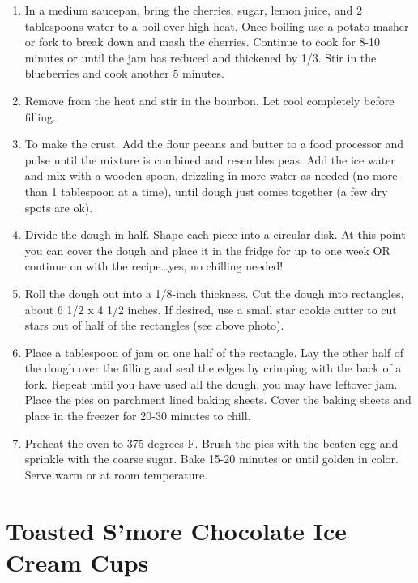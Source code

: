 \documentclass[
  letterpaper,
  DIV=11,
  numbers=noendperiod,
  titlepage=false]{scrreprt}
\providecommand{\tightlist}{%
  \setlength{\itemsep}{0pt}\setlength{\parskip}{0pt}}\usepackage{longtable,booktabs,array}
\begin{document}
\begin{enumerate}
\def\labelenumi{\arabic{enumi}.}
\tightlist
\item
  In a medium saucepan, bring the cherries, sugar, lemon juice, and 2
  tablespoons water to a boil over high heat. Once boiling use a potato
  masher or fork to break down and mash the cherries. Continue to cook
  for 8-10 minutes or until the jam has reduced and thickened by 1/3.
  Stir in the blueberries and cook another 5 minutes.
\item
  Remove from the heat and stir in the bourbon. Let cool completely
  before filling.
\item
  To make the crust. Add the flour pecans and butter to a food processor
  and pulse until the mixture is combined and resembles peas. Add the
  ice water and mix with a wooden spoon, drizzling in more water as
  needed (no more than 1 tablespoon at a time), until dough just comes
  together (a few dry spots are ok).
\item
  Divide the dough in half. Shape each piece into a circular disk. At
  this point you can cover the dough and place it in the fridge for up
  to one week OR continue on with the recipe\ldots yes, no chilling
  needed!
\item
  Roll the dough out into a 1/8-inch thickness. Cut the dough into
  rectangles, about 6 1/2 x 4 1/2 inches. If desired, use a small star
  cookie cutter to cut stars out of half of the rectangles (see above
  photo).
\item
  Place a tablespoon of jam on one half of the rectangle. Lay the other
  half of the dough over the filling and seal the edges by crimping with
  the back of a fork. Repeat until you have used all the dough, you may
  have leftover jam. Place the pies on parchment lined baking sheets.
  Cover the baking sheets and place in the freezer for 20-30 minutes to
  chill.
\item
  Preheat the oven to 375 degrees F. Brush the pies with the beaten egg
  and sprinkle with the coarse sugar. Bake 15-20 minutes or until golden
  in color. Serve warm or at room temperature.
\end{enumerate}


\chapter{Toasted S'more Chocolate Ice Cream
Cups}\label{toasted-smore-chocolate-ice-cream-cups}
\end{document}
